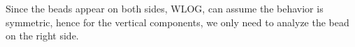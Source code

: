 \documentclass{article}
\newcommand{\br}{\overline{r}}
\newcommand{\bF}{\overline{F}}
\begin{document}
Since the beads appear on both sides, WLOG, can assume the behavior is symmetric, hence for the vertical components, we only need to analyze the bead on the right side.

\end{document}
